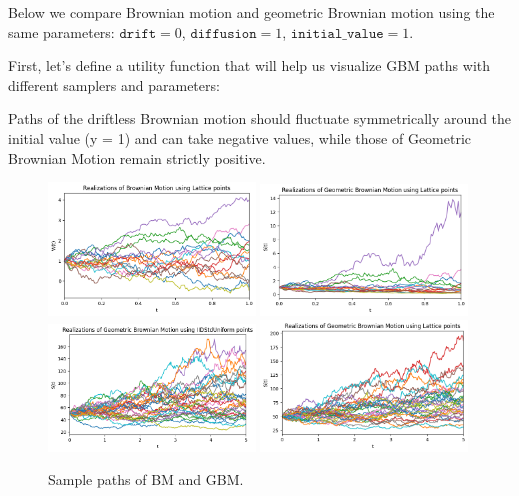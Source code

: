 \documentclass{article}
\begin{document}
Below we compare Brownian motion and geometric Brownian motion using the same parameters: $\texttt{drift} = 0$, $\texttt{diffusion} = 1$, $\texttt{initial\_value} = 1$.

First, let's define a utility function that will help us visualize GBM paths with different samplers and parameters:



Paths of the driftless Brownian motion should fluctuate symmetrically around the initial value (y = 1) and can take negative values, while those of Geometric Brownian Motion remain strictly positive.



\begin{figure}[t!]
\centering
\includegraphics[width=0.49\textwidth]{images/figure_1.png}
\includegraphics[width=0.49\textwidth]{images/figure_2.png}\\
\includegraphics[width=0.49\textwidth]{images/figure_3.png}
\includegraphics[width=0.49\textwidth]{images/figure_4.png}
\caption{Sample paths of BM and GBM.}
\end{figure}
\end{document}
